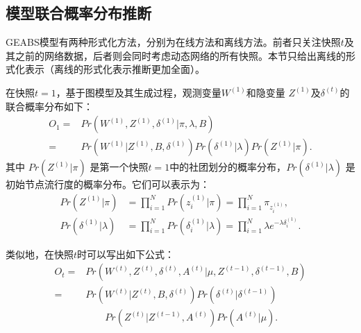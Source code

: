 \subsection{模型联合概率分布推断}



GEABS模型有两种形式化方法，分别为在线方法和离线方法。前者只关注快照$t$及其之前的网络数据，后者则会同时考虑动态网络的所有快照。本节只给出离线的形式化表示（离线的形式化表示推断更加全面）。

在快照$t=1$，基于图模型及其生成过程，观测变量$W^{(1)}$和隐变量 $Z^{(1)}$及$\delta^{(t)}$的联合概率分布如下：
\begin{align}
O_1 = & Pr(W^{(1)}, Z^{(1)}, \delta^{(1)} |\pi, \lambda, B) \nonumber\\
= & Pr(W^{(1)}|Z^{(1)},B,\delta^{(1)})  Pr(\delta^{(1)}|\lambda) Pr(Z^{(1)}|\pi). 
\label{eq:O1}
\end{align}
其中 $Pr(Z^{(1)} | \pi)$ 是第一个快照$t=1$中的社团划分的概率分布，$Pr(\delta^{(1)} | \lambda)$ 是初始节点流行度的概率分布。它们可以表示为：
\begin{align}
Pr (Z^{(1)}|\pi) &= \prod_{i=1}^{N} Pr(z_i^{(1)}|\pi) = \prod_{i=1}^{N} \pi_{z_i^{(1)}}, 
\label{eq:O6}\\
Pr (\delta^{(1)}|\lambda)  &= \prod_{i=1}^{N} Pr(\delta_i^{(1)}|\lambda)
 = \prod_{i=1}^{N} \lambda e^{-\lambda \delta_i^{(1)}}. 
\label{eq:O7}
\end{align}

类似地，在快照$t$时可以写出如下公式：
\begin{align}
O_t = & Pr(W^{(t)}, Z^{(t)}, \delta^{(t)}, A^{(t)} |\mu, Z^{(t-1)}, \delta^{(t-1)}, B) \nonumber\\
= & Pr(W^{(t)}|Z^{(t)},B,\delta^{(t)})  Pr(\delta^{(t)}|\delta^{(t-1)}) \nonumber\\ 
&\qquad Pr(Z^{(t)}|Z^{(t-1)}, A^{(t)}) Pr(A^{(t)} | \mu).
\label{eq:O2}
\end{align}

